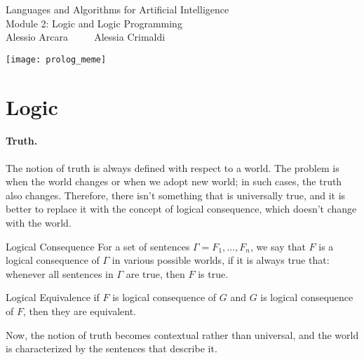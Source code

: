 \documentclass{article}
\author{Alessio Arcara, Alessia Crimaldi}
\begin{document}
\begin{titlepage}
    \vspace*{\fill}
	\centering
   	\Huge Languages and Algorithms for Artificial Intelligence\\
	\vspace{0.2cm}
   	\huge Module 2: Logic and Logic Programming\\
   	\vspace{0.7cm}
   	\Large Alessio Arcara $\qquad$ Alessia Crimaldi\\
   	\vspace{0.2cm}
   	\begin{center}
    	\texttt{[image: prolog\_meme]}
   	\end{center}
   	\vspace*{\fill}
\end{titlepage}

\tableofcontents
\clearpage

\parindent 0pt

\cleardoublepage

\section{Logic}
\paragraph{Truth.}
The notion of truth is always defined with respect to a world. The problem
is when the world changes or when we adopt new world; in such cases, the truth
also changes. Therefore, there isn't something that is universally true, and
it is better to replace it with the concept of logical consequence, which
doesn't change with the world. 

\begin{Definition}{Logical Consequence}{}
    For a set of sentences $\Gamma=F_1,\ldots,F_n$, we say that $F$ is a
    logical consequence of $\Gamma$ in various possible worlds, if it is
    always true that: whenever all sentences in $\Gamma$ are true, then $F$
    is true.
\end{Definition}
\begin{Definition}{Logical Equivalence}{}
    if $F$ is logical consequence of $G$ and $G$ is logical consequence of
    $F$, then they are equivalent.
\end{Definition}
Now, the notion of truth becomes contextual rather than universal, and the
world is characterized by the sentences that describe it.
\end{document}

